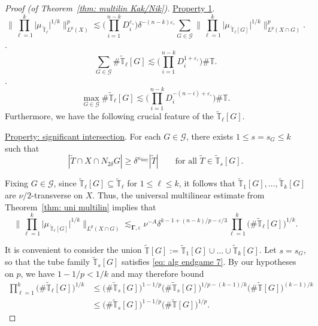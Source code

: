 \documentclass[reqno]{amsart}
\numberwithin{equation}{section}
\newcommand{\T}{\mathbb{T}}
\newcommand{\cG}{\mathcal{G}}
\newcommand{\bdGamma}{\boldsymbol{\Gamma}}
\theoremstyle{plain}
\theoremstyle{definition}
\newcommand{\ttiny}{\mathrm{tiny}}
\begin{document}
\begin{proof}[Proof (of Theorem~\ref{thm: multilin Kak/Nik})]
\noindent \underline{Property 1}. 
\begin{equation}\label{eq: alg endgame 4}
    \Big\|\prod_{\ell = 1}^k \big| \mu_{\,\widetilde{\T}_{\ell}}  \big|^{1/k} \Big\|_{L^p(X)}^p \lesssim \Big( \prod_{i = 1}^{n-k} D_i^{\varepsilon_{\circ}}\Big) \delta^{-(n-k)\varepsilon_{\circ}}  \sum_{G \in \cG} \Big\|\prod_{\ell = 1}^k \big|\mu_{\,\widetilde{\T}_{\ell}[G]}\big|^{1/k}\Big\|_{L^p(X \cap G)}^p.
\end{equation} 
.
\begin{equation}\label{eq: alg endgame 5}
     \sum_{G \in \cG} \#\widetilde{\T}_{\ell}[G] \lesssim \Big( \prod_{i = 1}^{n-k} D_i^{1 +\varepsilon_{\circ}}\Big) \#\T.
\end{equation}
.
\begin{equation}
\label{eq: alg endgame 6}
     \max_{G \in \cG} \#\widetilde{\T}_{\ell}[G] \lesssim \Big(\prod_{i = 1}^{n-k} D_i^{-(n-i)+\varepsilon_{\circ}}\Big) \#\T.
 \end{equation}
 Furthermore, we have the following crucial feature of the $\widetilde{\T}_{\ell}[G]$.\medskip
 
\noindent \underline{Property: significant intersection}. For each $G \in \cG$, there exists $1 \leq s = s_G  \leq k$ such that 
\begin{equation}\label{eq: alg endgame 7}
    |\widetilde{T} \cap X  \cap N_{2\delta}G| \geq \delta^{\kappa_{\ttiny}} |\widetilde{T}| \qquad \textrm{for all $\widetilde{T} \in \widetilde{\T}_s[G]$.}
\end{equation}

Fixing $G \in \cG$, since $\widetilde{\T}_{\ell}[G] \subseteq \widetilde{\T}_{\ell}$ for $1 \leq \ell \leq k$, it follows that $\widetilde{\T}_1[G], \dots, \widetilde{\T}_k[G]$ are $\nu/2$-transverse on $X$. Thus, the universal multilinear estimate from Theorem~\ref{thm: uni multilin} implies that
\begin{equation}\label{eq: alg endgame 8}
  \Big\|\prod_{\ell = 1}^k \big|\mu_{\,\widetilde{\T}_{\ell}[G]}\big|^{1/k}\Big\|_{L^p(X \cap G)} \lesssim_{\bdGamma, \varepsilon}  \nu^{-A}  \delta^{k - 1 + (n - k)/p - \varepsilon/3} \prod_{\ell = 1}^k \big(\#\widetilde{\T}_{\ell}[G]\big)^{1/k}.
\end{equation}

It is convenient to consider the union $\widetilde{\T}[G] := \widetilde{\T}_1[G] \cup \dots \cup \widetilde{\T}_k[G]$. Let $s = s_G$, so that the tube family $\widetilde{\T}_s[G]$ satisfies \eqref{eq: alg endgame 7}. By our hypotheses on $p$, we have $1-1/p<1/k$ and may therefore bound 
\begin{align}
\nonumber
    \prod_{\ell = 1}^k \big(\#\widetilde{\T}_{\ell}[G]\big)^{1/k} &\leq \big(\#\widetilde{\T}_s[G]\big)^{1-1/p} \big(\#\widetilde{\T}_s[G]\big)^{1/p - (k-1)/k} \big(\#\widetilde{\T}[G]\big)^{(k-1)/k} \\
    \label{eq: alg endgame 9}
    &\leq \big(\#\widetilde{\T}_s[G]\big)^{1-1/p}\big(\#\widetilde{\T}[G]\big)^{1/p}.
\end{align}


\end{proof}
\end{document}
